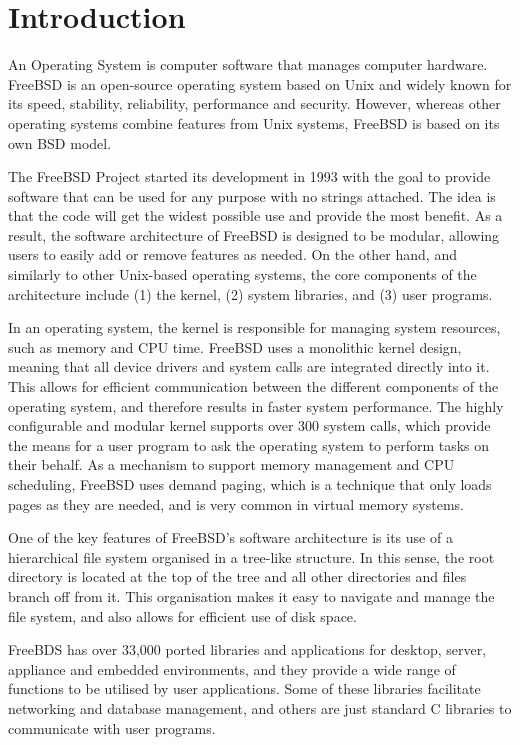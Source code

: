 \documentclass[12pt, dvipsnames, a4paper]{article}
\begin{document}
\section{Introduction}
An Operating System is computer software that manages computer hardware. FreeBSD is an open-source operating system based on Unix and widely known for its speed, stability, reliability, performance and security. However, whereas other operating systems combine features from Unix systems, FreeBSD is based on its own BSD model.

The FreeBSD Project started its development in 1993 with the goal to provide software that can be used for any purpose with no strings attached. The idea is that the code will get the widest possible use and provide the most benefit. As a result, the software architecture of FreeBSD is designed to be modular, allowing users to easily add or remove features as needed. On the other hand, and similarly to other Unix-based operating systems, the core components of the architecture include (1) the kernel, (2) system libraries, and (3) user programs. 

In an operating system, the kernel is responsible for managing system resources, such as memory and CPU time. FreeBSD uses a monolithic kernel design, meaning that all device drivers and system calls are integrated directly into it. This allows for efficient communication between the different components of the operating system, and therefore results in faster system performance. The highly configurable and modular kernel supports over 300 system calls, which provide the means for a user program to ask the operating system to perform tasks on their behalf. As a mechanism to support memory management and CPU scheduling, FreeBSD uses demand paging, which is a technique that only loads pages as they are needed, and is very common in virtual memory systems.

One of the key features of FreeBSD's software architecture is its use of a hierarchical file system organised in a tree-like structure. In this sense, the root directory is located at the top of the tree and all other directories and files branch off from it. This organisation makes it easy to navigate and manage the file system, and also allows for efficient use of disk space.

FreeBDS has over 33,000 ported libraries and applications for desktop, server, appliance and embedded environments, and they provide a wide range of functions to be utilised by user applications. Some of these libraries facilitate networking and database management, and others are just standard C libraries to communicate with user programs.
\end{document}
